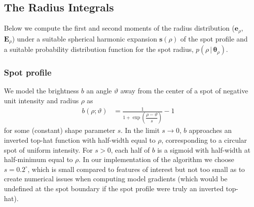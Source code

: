 \documentclass[modern]{aastex62}
\begin{document}
\subsection{The Radius Integrals}
\label{sec:size}
%
Below we compute the first and second moments
of the radius distribution ($\mathbf{e}_\rho$, $\mathbf{E}_\rho$) under
a suitable spherical harmonic expansion $\mathbf{s}(\rho)$ of the spot profile
and a suitable probability distribution function for the spot radius,
$p(\rho \, \big| \, \pmb{\theta}_{\rho})$.

\subsubsection{Spot profile}
%
We model the brightness $b$ an angle $\vartheta$ away from the
center of a spot of negative unit intensity and radius $\rho$ as
%
\begin{align}
    \label{eq:brvartheta}
    b(\rho; \vartheta) & = \frac{1}{1 + \exp\left(\dfrac{\rho-\vartheta}{s}\right)} - 1
\end{align}
%
for some (constant) shape parameter $s$. In the limit $s \rightarrow 0$, $b$ approaches an
inverted top-hat function with half-width equal to $\rho$,
corresponding to a circular spot of uniform intensity. For $s > 0$, each half
of $b$ is a sigmoid with half-width at half-minimum equal to $\rho$.
In our implementation of the algorithm we choose $s = 0.2^\circ$,
which is small compared to features of interest but not too small as to
create numerical issues when computing model gradients (which would be
undefined at the spot boundary if the spot profile were truly an inverted top-hat).
\end{document}
